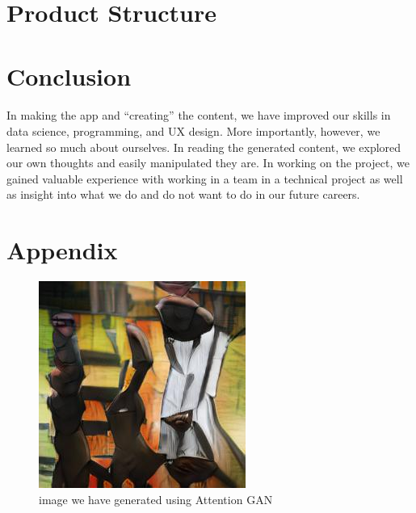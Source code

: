 \documentclass[12pt, letterpaper]{article}
\begin{document}
\section{Product Structure} 

\section{Conclusion}

\paragraph{}In making the app and “creating” the content, we have improved our skills in data science, programming, and UX design. More importantly, however, we learned so much about ourselves. In reading the generated content, we explored our own thoughts and easily manipulated they are. In working on the project, we gained valuable experience with working in a team in a technical project as well as insight into what we do and do not want to do in our future careers.

\section*{Appendix}

\begin{figure}[h]
	\begin{center}
		\includegraphics[width=\linewidth]{imgs/000001075.jpeg}
    		\caption[width=\linewidth]{image we have generated using Attention GAN}
    		\label{AttnGAN}
	\end{center}
\end{figure} 
\end{document}
